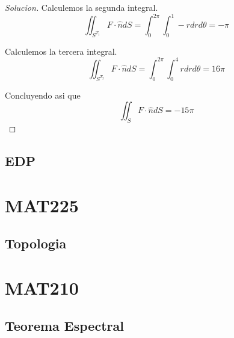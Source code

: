 \documentclass{article}
\theoremstyle{definition}
\newenvironment{solution}{\begin{proof}[Solucion]}{\end{proof}}
\begin{document}
\begin{solution}
  Calculemos la segunda integral.
  \begin{equation*}
    \iint_{S^{T_{1}}} F \cdot \hat{n} dS = \int_{0}^{2\pi}\int_{0}^{1} -r dr d\theta = -\pi
  \end{equation*}

  Calculemos la tercera integral.
  \begin{equation*}
    \iint_{S^{T_{2}}} F \cdot \hat{n} dS = \int_{0}^{2\pi}\int_{0}^{4} r dr d \theta = 16\pi
  \end{equation*}

  Concluyendo asi que
  \begin{equation*}
    \iint_{S} F \cdot \hat{n} dS = -15\pi
  \end{equation*}
\end{solution}

\subsection{EDP}

\section{MAT225}
\subsection{Topologia}

\section{MAT210}
\subsection{Teorema Espectral}
\end{document}
